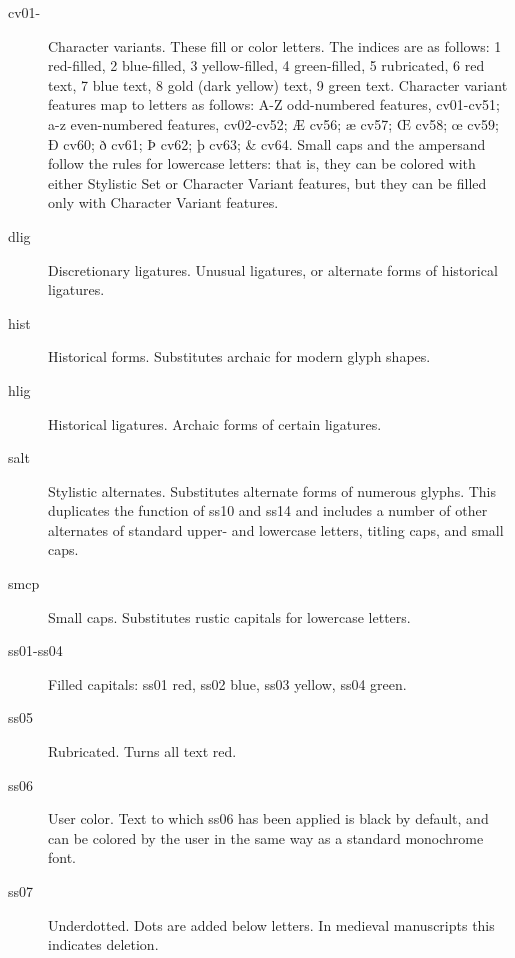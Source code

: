 \documentclass[11pt,letterpaper,twoside,openany]{book}
\begin{document}
{\normalsize\irrm
\begin{description}

  \item[\irsc cv01-] Character variants. These fill or color letters. The indices
  are as follows: 1 red-filled, 2 blue-filled, 3 yellow-filled, 4 green-filled,
  5 rubricated, 6 red text, 7 blue text, 8 gold (dark yellow) text, 9 green text.
  Character variant features map to letters as follows: A-Z odd-numbered
  features, cv01-cv51; a-z even-numbered features, cv02-cv52; Æ cv56;
  æ cv57; Œ cv58; œ cv59; Ð cv60; ð cv61; Þ cv62; þ cv63; \& cv64. Small caps
  and the ampersand follow the rules
  for lowercase letters: that is, they can be colored with either Stylistic
  Set or Character Variant features, but they can be filled only with
  Character Variant features.
  
  \item[\irsc dlig] Discretionary ligatures. Unusual ligatures, or alternate forms of
  historical ligatures.

  \item[\irsc hist] Historical forms. Substitutes archaic for modern glyph shapes.

  \item[\irsc hlig] Historical ligatures. Archaic forms of certain ligatures.

  \item[\irsc salt] Stylistic alternates. Substitutes alternate forms of numerous
  glyphs. This duplicates the function of ss10 and ss14 and includes a 
  number of other alternates of standard upper- and lowercase letters,
  titling caps, and small caps.

  \item[\irsc smcp] Small caps. Substitutes rustic capitals for lowercase letters.


  \item[\irsc ss01-ss04] Filled capitals: ss01 red, ss02 blue, ss03 yellow, ss04 green.

  \item[\irsc ss05] Rubricated. Turns all text red.

  \item[\irsc ss06] User color. Text to which ss06 has been applied is black by
  default, and can be colored by the user in the same way as a standard monochrome 
  font.

  \item[\irsc ss07] Underdotted. Dots are added below letters. In medieval
  manuscripts this indicates deletion.


\end{description}}
\end{document}
